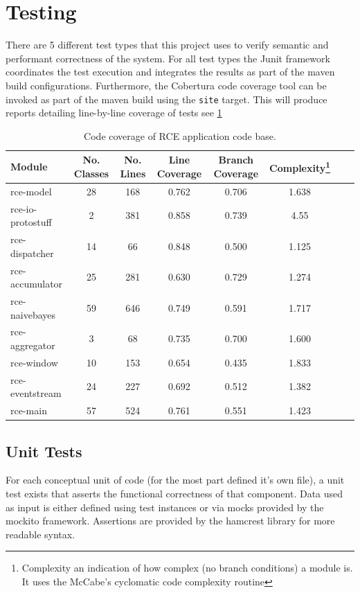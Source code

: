 \documentclass[a4paper,11pt]{scrreprt}
\begin{document}
\section{Testing}
There are 5 different test types that this project uses to verify semantic and performant correctness of the system. For all test types the Junit framework coordinates the test execution and integrates the results as part of the maven build configurations. Furthermore, the Cobertura code coverage tool can be invoked as part of the maven build using the \verb|site| target. This will produce reports detailing line-by-line coverage of tests see \ref{tab:coverage}
\begin{table}[h!]
\begin{tabular}{l*{6}{c}r}
Module              & No. Classes & No. Lines & Line Coverage & Branch Coverage & Complexity\footnote{Complexity an indication of how complex (no branch conditions) a module is. It uses the McCabe's cyclomatic code complexity routine\cite{mccabecc}} \\
\hline
rce-model & 28 & 168 & 0.762 & 0.706 & 1.638 \\
rce-io-protostuff & 2 & 381 & 0.858 & 0.739 & 4.55 \\
rce-dispatcher & 14 & 66 & 0.848 & 0.500 & 1.125 \\
rce-accumulator & 25 & 281 & 0.630 & 0.729 & 1.274 \\
rce-naivebayes & 59 & 646 & 0.749 & 0.591 & 1.717 \\
rce-aggregator & 3 & 68 & 0.735 & 0.700 & 1.600 \\
rce-window & 10 & 153 & 0.654 & 0.435 & 1.833 \\
rce-eventstream & 24 & 227 & 0.692 & 0.512 & 1.382 \\
rce-main & 57 & 524 & 0.761 & 0.551 & 1.423 \\
\end{tabular}
\caption{Code coverage of RCE application code base.}
\label{tab:coverage}
\end{table}

\subsection{Unit Tests}
For each conceptual unit of code (for the most part defined it's own file), a unit test exists that asserts the functional correctness of that component. Data used as input is either defined using test instances or via mocks provided by the mockito framework. Assertions are provided by the hamcrest library for more readable syntax.
\end{document}
